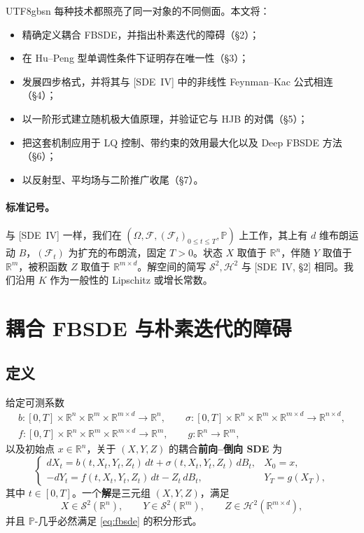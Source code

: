 \documentclass{article}
\theoremstyle{plain}
\theoremstyle{definition}
\theoremstyle{remark}
\numberwithin{equation}{section}
\newcommand{\Prob}{\mathbb{P}}
\newcommand{\R}{\mathbb{R}}
\newcommand{\F}{\mathcal{F}}
\newcommand{\Sc}{\mathcal{S}}
\newcommand{\Hc}{\mathcal{H}}
\begin{document}
\begin{CJK*}{UTF8}{gbsn}
每种技术都照亮了同一对象的不同侧面。本文将：
\begin{itemize}
  \item 精确定义耦合 FBSDE，并指出朴素迭代的障碍（\S2）；
  \item 在 Hu--Peng 型单调性条件下证明存在唯一性（\S3）；
  \item 发展四步格式，并将其与 [SDE~IV] 中的非线性 Feynman--Kac 公式相连（\S4）；
  \item 以一阶形式建立随机极大值原理，并验证它与 HJB 的对偶（\S5）；
  \item 把这套机制应用于 LQ 控制、带约束的效用最大化以及 Deep FBSDE 方法（\S6）；
  \item 以反射型、平均场与二阶推广收尾（\S7）。
\end{itemize}

\paragraph{标准记号。} 与 [SDE~IV] 一样，我们在 $(\Omega,\F,(\F_t)_{0\le t\le T},\Prob)$ 上工作，其上有 $d$ 维布朗运动 $B$，$(\F_t)$ 为扩充的布朗流，固定 $T>0$。状态 $X$ 取值于 $\R^n$，伴随 $Y$ 取值于 $\R^m$，被积函数 $Z$ 取值于 $\R^{m\times d}$。解空间的简写 $\Sc^2,\Hc^2$ 与 [SDE~IV, \S2] 相同。我们沿用 $K$ 作为一般性的 Lipschitz 或增长常数。

\section{耦合 FBSDE 与朴素迭代的障碍}

\subsection{定义}

\begin{definition}[FBSDE]\label{def:fbsde}
给定可测系数
\begin{gather*}
  b:[0,T]\times\R^n\times\R^m\times\R^{m\times d}\to\R^n,\qquad
  \sigma:[0,T]\times\R^n\times\R^m\times\R^{m\times d}\to\R^{n\times d},\\
  f:[0,T]\times\R^n\times\R^m\times\R^{m\times d}\to\R^m,\qquad
  g:\R^n\to\R^m,
\end{gather*}
以及初始点 $x\in\R^n$，关于 $(X,Y,Z)$ 的耦合\textbf{前向--倒向 SDE} 为
\begin{equation}\label{eq:fbsde}
  \begin{cases}
    dX_t=b(t,X_t,Y_t,Z_t)\,dt+\sigma(t,X_t,Y_t,Z_t)\,dB_t, & X_0=x,\\[3pt]
    -dY_t=f(t,X_t,Y_t,Z_t)\,dt-Z_t\,dB_t, & Y_T=g(X_T),
  \end{cases}
\end{equation}
其中 $t\in[0,T]$。一个\textbf{解}是三元组 $(X,Y,Z)$，满足
\[
  X\in\Sc^2(\R^n),\qquad Y\in\Sc^2(\R^m),\qquad Z\in\Hc^2(\R^{m\times d}),
\]
并且 $\Prob$-几乎必然满足 \eqref{eq:fbsde} 的积分形式。
\end{definition}


\end{CJK*}
\end{document}
